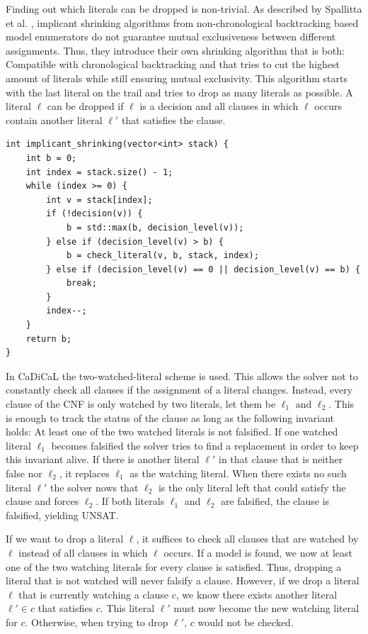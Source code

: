 \documentclass[12pt,a4paper]{article}
\begin{document}
Finding out which literals can be dropped is non-trivial. As described by Spallitta et al. \cite{Spallitta_Sebastiani_Biere_2024}, implicant shrinking algorithms from non-chronological backtracking based model enumerators do not guarantee mutual exclusiveness between different assignments. Thus, they introduce their own shrinking algorithm that is both: Compatible with chronological backtracking and that tries to cut the highest amount of literals while still ensuring mutual exclusivity. This algorithm starts with the last literal on the trail and tries to drop as many literals as possible. A literal \(\ell\) can be dropped if \(\ell\) is a decision and all clauses in which \(\ell\) occurs contain another literal \(\ell'\) that satisfies the clause.

\begin{verbatim}
int implicant_shrinking(vector<int> stack) {
    int b = 0;
    int index = stack.size() - 1;
    while (index >= 0) {
        int v = stack[index];
        if (!decision(v)) {
            b = std::max(b, decision_level(v));
        } else if (decision_level(v) > b) {
            b = check_literal(v, b, stack, index);
        } else if (decision_level(v) == 0 || decision_level(v) == b) {
            break;
        }
        index--;
    }
    return b;
}
\end{verbatim}

In CaDiCaL the two-watched-literal scheme is used. This allows the solver not to constantly check all clauses if the assignment of a literal changes. Instead, every clause of the CNF is only watched by two literals, let them be \(\ell_1 \text{ and } \ell_2\). This is enough to track the status of the clause as long as the following invariant holds: At least one of the two watched literals is not falsified. If one watched literal \(\ell_1\) becomes falsified the solver tries to find a replacement in order to keep this invariant alive. If there is another literal \(\ell'\) in that clause that is neither false nor \(\ell_2\), it replaces \(\ell_1\) as the watching literal. When there exists no such literal \(\ell'\) the solver nows that \(\ell_2\) is the only literal left that could satisfy the clause and forces \(\ell_2\). If both literals \(\ell_1\) and \(\ell_2\) are falsified, the clause is falsified, yielding UNSAT.

If we want to drop a literal \(\ell\), it suffices to check all clauses that are watched by \(\ell\) instead of all clauses in which \(\ell\) occurs. If a model is found, we now at least one of the two watching literals for every clause is satisfied. Thus, dropping a literal that is not watched will never falsify a clause. However, if we drop a literal \(\ell\) that is currently watching a clause \(c\), we know there exists another literal \(\ell' \in c\) that satisfies \(c\). This literal \(\ell'\) must now become the new watching literal for \(c\). Otherwise, when trying to drop \(\ell'\), \(c\) would not be checked.
\end{document}

